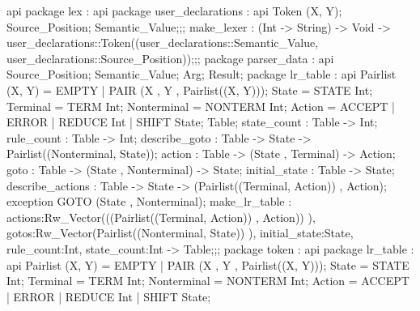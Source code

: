 api {   package lex
          : api {   package user_declarations
                      : api {
                            Token (X, Y);
                            Source_Position;
                            Semantic_Value;};;
                    make_lexer :
                        (Int -> String)
                        ->
                        Void
                        ->
                        user_declarations::Token((user_declarations::Semantic_Value, user_declarations::Source_Position));};;
        package parser_data
          : api {
                Source_Position;
                Semantic_Value;
                Arg;
                Result;
                    package lr_table
                      : api {
                            Pairlist (X, Y) = EMPTY | PAIR (X , Y , Pairlist((X, Y)));
                            State  = STATE Int;
                            Terminal  = TERM Int;
                            Nonterminal  = NONTERM Int;
                            Action  = ACCEPT | ERROR | REDUCE Int | SHIFT State;
                            Table;
                            state_count : Table -> Int;
                            rule_count : Table -> Int;
                            describe_goto : Table -> State -> Pairlist((Nonterminal, State));
                            action : Table -> (State , Terminal) -> Action;
                            goto : Table -> (State , Nonterminal) -> State;
                            initial_state : Table -> State;
                            describe_actions : Table -> State -> (Pairlist((Terminal, Action)) , Action);
                            exception GOTO (State , Nonterminal);
                                make_lr_table :
                                        {actions:Rw_Vector(((Pairlist((Terminal, Action)) , Action)) ),
                                        gotos:Rw_Vector(Pairlist((Nonterminal, State)) ), initial_state:State, rule_count:Int,
                                        state_count:Int}
                                    ->
                                    Table;};;
                    package token
                      : api {   package lr_table
                                  : api {
                                        Pairlist (X, Y) = EMPTY | PAIR (X , Y , Pairlist((X, Y)));
                                        State  = STATE Int;
                                        Terminal  = TERM Int;
                                        Nonterminal  = NONTERM Int;
                                        Action  = ACCEPT | ERROR | REDUCE Int | SHIFT State;
}}}}

